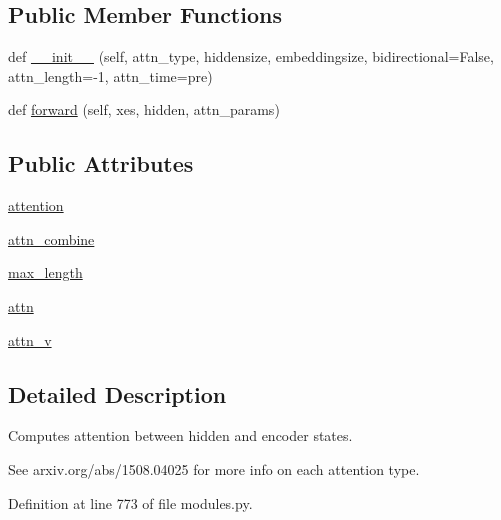 \subsection*{Public Member Functions}
\begin{DoxyCompactItemize}
\item 
def \hyperlink{classcontrollable__seq2seq_1_1modules_1_1AttentionLayer_a8c89cc171cf09decb5d3ed91ca0f04db}{\+\_\+\+\_\+init\+\_\+\+\_\+} (self, attn\+\_\+type, hiddensize, embeddingsize, bidirectional=False, attn\+\_\+length=-\/1, attn\+\_\+time=\textquotesingle{}pre\textquotesingle{})
\item 
def \hyperlink{classcontrollable__seq2seq_1_1modules_1_1AttentionLayer_a908031aac1e672fba1a7760f84b453a5}{forward} (self, xes, hidden, attn\+\_\+params)
\end{DoxyCompactItemize}
\subsection*{Public Attributes}
\begin{DoxyCompactItemize}
\item 
\hyperlink{classcontrollable__seq2seq_1_1modules_1_1AttentionLayer_a13769759702e0da66efe31953796eba2}{attention}
\item 
\hyperlink{classcontrollable__seq2seq_1_1modules_1_1AttentionLayer_ab95d1744eac0f5b8729e45434f6c01db}{attn\+\_\+combine}
\item 
\hyperlink{classcontrollable__seq2seq_1_1modules_1_1AttentionLayer_aa9561ae460a709651164167155f0a472}{max\+\_\+length}
\item 
\hyperlink{classcontrollable__seq2seq_1_1modules_1_1AttentionLayer_aaec4b2aa251549f510cb35c064d39f35}{attn}
\item 
\hyperlink{classcontrollable__seq2seq_1_1modules_1_1AttentionLayer_aa232f7fe7d2de13d30a7f1b45042e03d}{attn\+\_\+v}
\end{DoxyCompactItemize}


\subsection{Detailed Description}
\begin{DoxyVerb}Computes attention between hidden and encoder states.

See arxiv.org/abs/1508.04025 for more info on each attention type.
\end{DoxyVerb}
 

Definition at line 773 of file modules.\+py.



